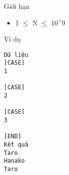 Giới hạn
\begin{itemize}
	\item     1  $\le$  N  $\le$  10^9   
\end{itemize}
Ví dụ
\begin{verbatim}
Dữ liệu
[CASE]
1

[CASE]
2

[CASE]
3

[END]
Kết quả
Taro
Hanako
Taro
\end{verbatim}